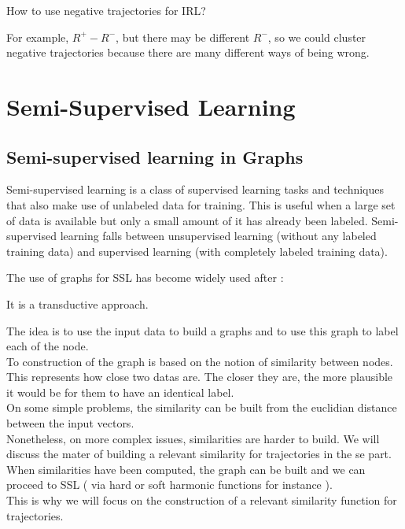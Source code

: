 \documentclass{article}
\begin{document}
How to use negative trajectories for IRL?

For example, $R^+ - R^-$, but there may be different $R^-$, so we could cluster negative trajectories because there are many different ways of being wrong.


\section{Semi-Supervised Learning \label{sec:ssl}}

\subsection{Semi-supervised learning in Graphs}


Semi-supervised learning is a class of supervised learning tasks and techniques that also make use of unlabeled data for training. This is useful when a large set of data is available but only a small amount of it has already been labeled. Semi-supervised learning falls between unsupervised learning (without any labeled training data) and supervised learning (with completely labeled training data).

The use of graphs for SSL has become widely used after : \cite{Zhu03}

It is a transductive approach.

The idea is to use the input data to build a graphs and to use this graph to label each of the node. \\
To construction of the graph is based on the notion of similarity between nodes.\\ This represents how close two datas are. The closer they are, the more plausible it would be for them to have an identical label.\\
On some simple problems, the similarity can be built from the euclidian distance between the input vectors.\\
Nonetheless, on more complex issues, similarities are harder to build. We will discuss the mater of building a relevant similarity for trajectories in the se part.
When similarities have been computed, the graph can be built and we can proceed to SSL ( via hard or soft harmonic functions for instance ).\\
This is why we will focus on the construction of a relevant similarity function for trajectories.

\end{document}
